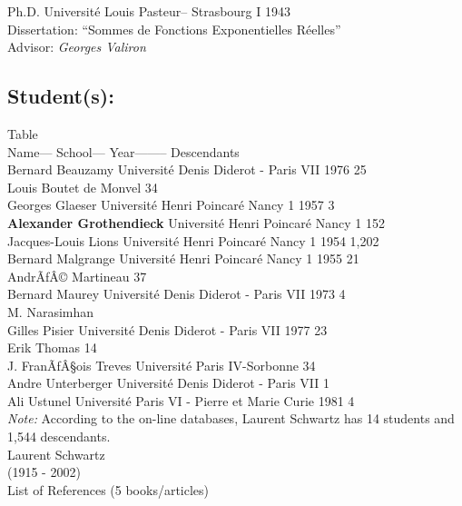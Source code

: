 \documentclass[12pt]{article}
\theoremstyle{plain}
\theoremstyle{definition}
\numberwithin{equation}{section}
\newcommand{\med}{\medbreak}
\begin{document}

Ph.D. Universit\'e Louis Pasteur-- Strasbourg I    1943 \\ 
Dissertation: ``Sommes de Fonctions Exponentielles R\'eelles'' \\
Advisor: {\em Georges Valiron} \\

\subsection{Student(s):} 

Table \\
Name--- School--- Year--------                                 Descendants \\

Bernard Beauzamy Universit\'e Denis Diderot - Paris VII 1976        25 \\
Louis Boutet de Monvel    34 \\
Georges Glaeser Universit\'e Henri Poincar\'e Nancy 1 1957 3 \\
{\bf Alexander Grothendieck}  Universit\'e Henri Poincar\'e Nancy 1   152 \\
Jacques-Louis Lions Universit\'e Henri Poincar\'e Nancy 1 1954      1,202 \\
Bernard Malgrange Universit\'e Henri Poincar\'e Nancy 1 1955 21 \\
AndrÃƒÂ© Martineau    37   \\
Bernard Maurey Universit\'e Denis Diderot - Paris VII 1973 4 \\
M. Narasimhan     \\
Gilles Pisier Universit\'e Denis Diderot - Paris VII 1977 23 \\
Erik Thomas    14 \\
J. FranÃƒÂ§ois Treves Universit\'e Paris IV-Sorbonne   34 \\
Andre Unterberger Universit\'e Denis Diderot - Paris VII   1 \\
Ali Ustunel Universit\'e Paris VI - Pierre et Marie Curie 1981 4 \\
\med
{\em Note:} According to the on-line databases, Laurent Schwartz has 14 students and 1,544 descendants.\\

Laurent Schwartz \\

(1915 - 2002)\\
 
List of References (5 books/articles) \\
  
\end{document}
